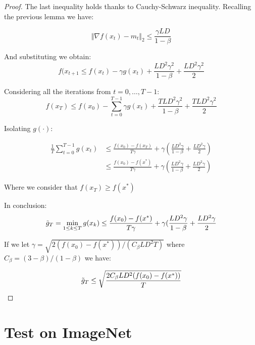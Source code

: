 \documentclass[10pt,twocolumn,letterpaper, english]{article}
\theoremstyle{definition}
\theoremstyle{plain}
\theoremstyle{plain}
\theoremstyle{plain}
\theoremstyle{plain}
\theoremstyle{remark}
\theoremstyle{remark}
\theoremstyle{definition}
\theoremstyle{definition}
\theoremstyle{definition}
\theoremstyle{definition}
\begin{document}
\begin{proof}
The last inequality holds thanks to Cauchy-Schwarz inequality. Recalling the previous lemma we have:

\begin{equation*}
    \Vert \nabla f(x_t) - m_t \Vert_{2} \le \frac{\gamma LD}{ 1 - \beta}
\end{equation*}

And substituting we obtain:
\begin{equation*}
    f(x_{t+1} \le f(x_t) - \gamma g(x_t) + \frac{L D^2 \gamma^2}{1 - \beta} + \frac{L D^2 \gamma^2}{2}
\end{equation*}

Considering all the iterations from $t=0, \dots, T-1$:
\begin{equation*}
    f(x_{T}) \le f(x_0) - \sum_{t=0}^{T-1} \gamma g(x_t) + \frac{T L D^2 \gamma^2}{1 - \beta} + \frac{T L D^2 \gamma^2}{2}
\end{equation*}

Isolating $g(\cdot)$:

\begin{align*}
    \frac{1}{T}\sum_{t=0}^{T-1} g(x_t) & \le \frac{f(x_0)-f(x_T)}{T\gamma} + \gamma(\frac{ L D^2 \gamma}{1 - \beta} + \frac{ L D^2 \gamma}{2})\\
    & \le \frac{f(x_0)-f(x^\ast)}{T\gamma} + \gamma(\frac{ L D^2 \gamma}{1 - \beta} + \frac{ L D^2 \gamma}{2})
\end{align*}

Where we consider that $f(x_T) \ge f(x^\ast)$

In conclusion:
\begin{equation*}
    \Tilde{g}_T= \min_{1 \le k \le T}g(x_k) \le \frac{f(x_0)-f(x^\ast)}{T\gamma} + \gamma(\frac{ L D^2 \gamma}{1 - \beta} + \frac{ L D^2 \gamma}{2} 
\end{equation*}

If we let $ \gamma= \sqrt{2(f(x_0)- f(x^\ast))/(C_\beta L D^2 T )}$ where $C_{\beta}=(3-\beta)/(1-\beta)$ we have:

\begin{equation*}
    \Tilde{g}_T \le \sqrt{ \frac{2C_\beta L D^2 (f(x_0)- f(x^\ast))}{T}}
\end{equation*}

\end{proof}








\section{Test on ImageNet}
\end{document}
